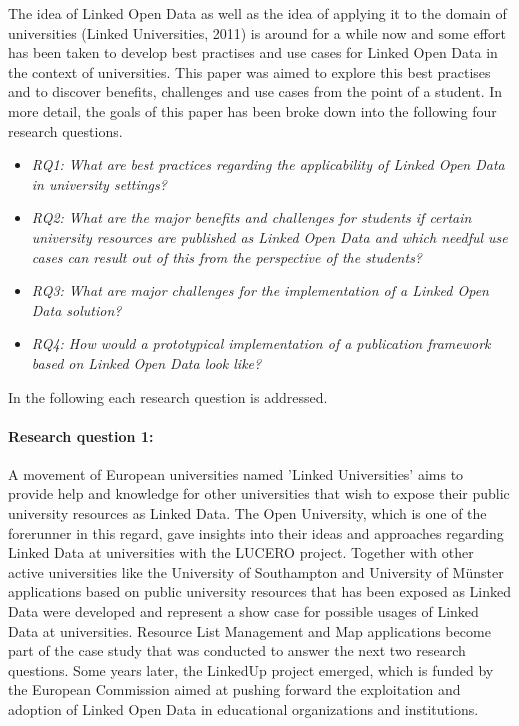 \documentclass{article}
\begin{document}
The idea of Linked Open Data as well as the idea of applying it to the domain of universities (Linked Universities, 2011) is around for a while now and some effort has been taken to develop best practises and use cases for Linked Open Data in the context of universities. This paper was aimed to explore this best practises and to discover benefits, challenges and use cases from the point of a student. In more detail, the goals of this paper has been broke down into the following four research questions. 

\begin{itemize}
	\item \textit{RQ1: What are best practices regarding the applicability of Linked Open Data in university settings?}
	\item \textit{RQ2: What are the major benefits and challenges for students if certain university resources are published as Linked Open Data and which needful use cases can result out of this from the perspective of the students?}
	\item \textit{RQ3: What are major challenges for the implementation of a Linked Open Data solution?}
	\item \textit{RQ4: How would a prototypical implementation of a publication framework based on Linked Open Data look like?}
\end{itemize}

In the following each research question is addressed.

\paragraph{Research question 1:} A movement of European universities named 'Linked Universities' aims to provide help and knowledge for other universities that wish to expose their public university resources as Linked Data. The Open University, which is one of the forerunner in this regard, gave insights into their ideas and approaches regarding Linked Data at universities with the LUCERO project. Together with other active universities like the University of Southampton and University of Münster applications based on public university resources that has been exposed as Linked Data were developed and represent a show case for possible usages of Linked Data at universities. Resource List Management and Map applications become part of the case study that was conducted to answer the next two research questions. Some years later, the LinkedUp project emerged, which is funded by the European Commission aimed at pushing forward the exploitation and adoption of Linked Open Data in educational organizations and institutions. 
\end{document}
